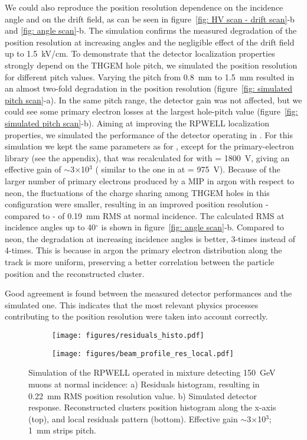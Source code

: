 We could also reproduce the position resolution dependence on the incidence angle and on the drift field, as can be seen in figure~\ref{fig: HV scan - drift scan}-b and \ref{fig: angle scan}-b. The simulation confirms the measured degradation of the position resolution at increasing angles and the negligible effect of the drift field up to 1.5~kV/cm.
To demonstrate that the detector localization properties strongly depend on the THGEM hole pitch, we simulated the position resolution for different pitch values. Varying the pitch from 0.8~mm to 1.5~mm resulted in an almost two-fold degradation in the position resolution (figure~\ref{fig: simulated pitch scan}-a). In the same pitch range, the detector gain was not affected, but we could see some primary electron losses at the largest hole-pitch value (figure~\ref{fig: simulated pitch scan}-b).
Aiming at improving the RPWELL localization properties, we simulated the performance of the detector operating in \arch. For this simulation we kept the same parameters as for \nech, except for the primary-electron library (see the appendix), that was recalculated for \arch with \dvrpwell= 1800~V, giving an effective gain of $\sim$3$\times$10$^3$ ( similar to the one in \nech at \dvrpwell= 975~V).
Because of the larger number of primary electrons produced by a MIP in argon with respect to neon, the fluctuations of the charge sharing among THGEM holes in this configuration were smaller, resulting in an improved position resolution - compared to \nech - of 0.19~mm RMS at normal incidence. The calculated RMS at incidence angles up to 40$^\circ$ is shown in figure~\ref{fig: angle scan}-b. Compared to neon, the degradation at increasing incidence angles is better, 3-times instead of 4-times. This is because in argon the primary electron distribution along the track is more uniform, preserving a better correlation between the particle position and the reconstructed cluster.

Good agreement is found between the measured detector performances and the simulated one. This indicates that the most relevant physics processes contributing to the position resolution were taken into account correctly.  

\begin{figure}[h]
\begin{subfigure}[t]{0.45\textwidth}\caption{}
\texttt{[image: figures/residuals\_histo.pdf]}
\end{subfigure}
\begin{subfigure}[t]{0.6\textwidth}\caption{}
\texttt{[image: figures/beam\_profile\_res\_local.pdf]}
\end{subfigure}
\caption{Simulation of the RPWELL operated in \nech mixture detecting 150~GeV muons at normal incidence: a) Residuals histogram, resulting in 0.22~mm RMS position resolution value. b) Simulated detector response. Reconstructed clusters position histogram along the x-axis (top), and local residuals pattern (bottom). Effective gain $\sim$3$\times$10$^3$; 1~mm strips pitch.}\label{fig: simulation residuals - profile}
\end{figure}

